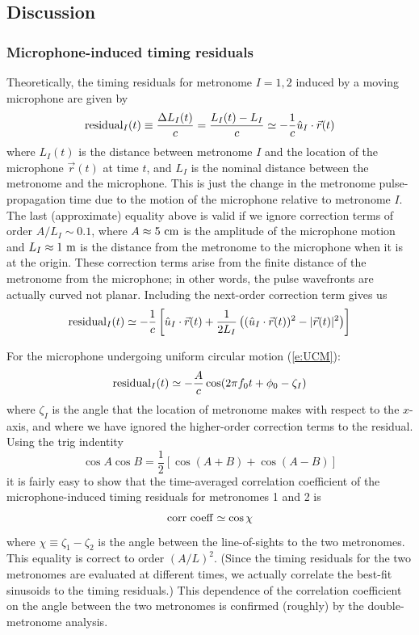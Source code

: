 \documentclass[10pt]{NSF}
\def\be{\begin{equation}}
\def\ee{\end{equation}}
\begin{document}
\subsection{Discussion}
\label{s:discussion}

\subsubsection{Microphone-induced timing residuals}
\label{s:timingresiduals}

Theoretically, the timing residuals for metronome $I=1,2$ induced 
by a moving microphone are given by
%
\be
{\rm residual}_I(t)
\equiv\frac{\Delta L_I(t)}{c}
=\frac{L_I(t)-L_I}{c}
\simeq 
-\frac{1}{c} \hat u_I\cdot \vec r(t)
\label{e:timingresidual}
\ee
%
where $L_I(t)$ is the distance between 
metronome $I$ and the location of the 
microphone $\vec r(t)$ at time $t$,
and $L_I$ is the nominal distance between the
metronome and the microphone.
This is just the change in the 
metronome pulse-propagation time due to the motion
of the microphone relative to metronome $I$.
The last (approximate) equality above is valid 
if we ignore 
correction terms of order $A/L_I\sim 0.1$, where 
$A\approx 5~{\rm cm}$ is the amplitude of the 
microphone motion and $L_I\approx 1~{\rm m}$ 
is the distance from the metronome to the 
microphone when it is at the origin.
These correction terms arise from the finite distance
of the metronome from the microphone; in other words,
the pulse wavefronts are actually curved not planar.
Including the next-order correction term gives us
%
\be
{\rm residual}_I(t)
\simeq 
-\frac{1}{c}
\left[\hat u_I\cdot \vec r(t)+\frac{1}{2L_I}
\left((\hat u_I\cdot \vec r(t))^2 - |\vec r(t)|^2\right)\right]
\ee
%

For the microphone undergoing uniform circular motion (\ref{e:UCM}):
%
\be
{\rm residual}_I(t)
\simeq -\frac{A}{c}\cos(2\pi f_0 t+\phi_0-\zeta_I)
\ee
%
%
where $\zeta_I$ is the angle that the location of metronome 
makes with respect to the $x$-axis, and where we have ignored
the higher-order correction terms to the residual.
Using the trig indentity 
%
\be
\cos A\cos B =\frac{1}{2}\left[
\cos(A+B) + \cos(A-B)
\right]
\ee
%
it is fairly easy to show that the time-averaged 
correlation coefficient of
the microphone-induced timing residuals for metronomes 1 and 2 is
%
\be
{\rm corr\ coeff} \simeq \cos\chi
\ee
%
where $\chi\equiv \zeta_1-\zeta_2$ is the angle between the line-of-sights
to the two metronomes.
This equality is correct to order $(A/L)^2$.
(Since the timing residuals 
for the two metronomes
are evaluated at different times, we actually correlate the 
best-fit sinusoids to the timing residuals.)
This dependence of the correlation coefficient on the angle
between the two metronomes is confirmed (roughly) by the 
double-metronome analysis.
\end{document}
